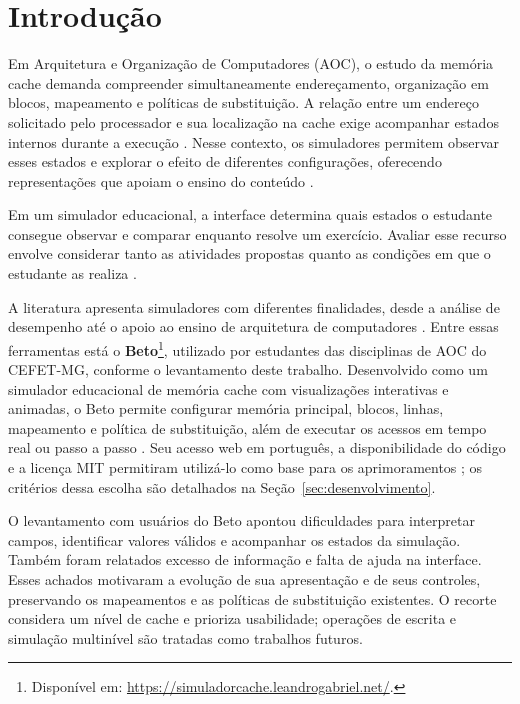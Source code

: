 \documentclass[article,12pt,oneside,a4paper,english,brazil]{abntex2}
\begin{document}
\section{Introdução}
\label{sec:introducao}

Em Arquitetura e Organização de Computadores (AOC), o estudo da memória cache demanda compreender simultaneamente endereçamento, organização em blocos, mapeamento e políticas de substituição. A relação entre um endereço solicitado pelo processador e sua localização na cache exige acompanhar estados internos durante a execução \cite{patterson2014computer}. Nesse contexto, os simuladores permitem observar esses estados e explorar o efeito de diferentes configurações, oferecendo representações que apoiam o ensino do conteúdo \cite{gabriel2022beto}.

Em um simulador educacional, a interface determina quais estados o estudante consegue observar e comparar enquanto resolve um exercício. Avaliar esse recurso envolve considerar tanto as atividades propostas quanto as condições em que o estudante as realiza \cite{godoi2009avaliacao,araujo2017protocolo}.

A literatura apresenta simuladores com diferentes finalidades, desde a análise de desempenho até o apoio ao ensino de arquitetura de computadores \cite{brais2020survey}. Entre essas ferramentas está o \textbf{Beto}\footnote{Disponível em: \url{https://simuladorcache.leandrogabriel.net/}.}, utilizado por estudantes das disciplinas de AOC do CEFET-MG, conforme o levantamento deste trabalho. Desenvolvido como um simulador educacional de memória cache com visualizações interativas e animadas, o Beto permite configurar memória principal, blocos, linhas, mapeamento e política de substituição, além de executar os acessos em tempo real ou passo a passo \cite{gabriel2022beto,betoweb2026}. Seu acesso web em português, a disponibilidade do código e a licença MIT permitiram utilizá-lo como base para os aprimoramentos \cite{leogithub2026}; os critérios dessa escolha são detalhados na Seção~\ref{sec:desenvolvimento}.

O levantamento com usuários do Beto apontou dificuldades para interpretar campos, identificar valores válidos e acompanhar os estados da simulação. Também foram relatados excesso de informação e falta de ajuda na interface. Esses achados motivaram a evolução de sua apresentação e de seus controles, preservando os mapeamentos e as políticas de substituição existentes. O recorte considera um nível de cache e prioriza usabilidade; operações de escrita e simulação multinível são tratadas como trabalhos futuros.
\end{document}

